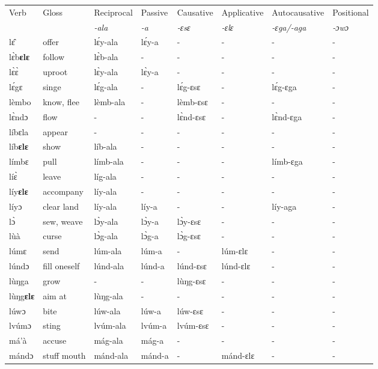 \begin{sidewaystable}
\begin{tabular}{llllllll}
 \lsptoprule
 Verb & Gloss & Reciprocal & Passive  & Causative  & Applicative   & Autocausative & Positional   \\
  &    & {\itshape -ala} & {\itshape -a} & {\itshape -ɛsɛ} & {\itshape -ɛlɛ} & {\itshape -ɛga/-aga}  & {\itshape -ɔwɔ}  \\
\midrule
lɛ̂ & offer & lɛ́y-ala & lɛ́y-a & - & - & - & - \\
lɛ̀b{\bfseries ɛlɛ} & follow & lɛ̀b-ala & - & - & - & - & - \\
lɛ̀ɛ̀ & uproot & lɛ̀y-ala & lɛ̀y-a & - & - & - & - \\
lɛ́gɛ & singe & lɛ́g-ala & - &  lɛ́g-ɛsɛ & - & lɛ́g-ɛga & - \\
lèmbo & know, flee & lèmb-ala & - & lèmb-ɛsɛ & - & - & - \\
lɛ̀ndɔ & flow & - & - & lɛ̀nd-ɛsɛ & - & lɛ̀nd-ɛga & - \\
líbɛla & appear & - & - & - & - & - & - \\
líb{\bfseries ɛlɛ} & show & líb-ala & - & - & - & - & - \\
límbɛ & pull & límb-ala & - & - & - & límb-ɛga & - \\
líɛ̀ & leave & líg-ala & - & - & - & - & - \\
líy{\bfseries ɛlɛ} & accompany & líy-ala & - & - & - & - & - \\
líyɔ & clear land & líy-ala &  líy-a & - & - & líy-aga & - \\
lɔ̀ & sew, weave & lɔ̀y-ala & lɔ̀y-a & lɔ̀y-ɛsɛ & - & - & - \\
lùà & curse & lɔ̀g-ala & lɔ̀g-a & lɔ̀g-ɛsɛ & - & - & - \\
lúmɛ & send & lúm-ala & lúm-a & - &  lúm-ɛlɛ & - & - \\
lúndɔ & fill oneself & lúnd-ala & lúnd-a & lúnd-ɛsɛ & lúnd-ɛlɛ & - & - \\
lùŋga & grow & - &  - & lùŋg-ɛsɛ & - & - & - \\
lùŋg{\bfseries ɛlɛ} & aim at & lùŋg-ala & - & - & - & - & - \\
lúwɔ & bite & lúw-ala & lúw-a & lúw-ɛsɛ & - & - & - \\
lvúmɔ & sting & lvúm-ala & lvúm-a & lvúm-ɛsɛ & - & - & - \\
má'à & accuse & mág-ala &  mág-a & - & - & - & - \\
mándɔ & stuff mouth & mánd-ala & mánd-a & - &  mánd-ɛlɛ & - & - \\
\midrule\end{tabular}\end{sidewaystable}


